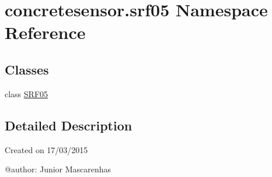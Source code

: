 \hypertarget{namespaceconcretesensor_1_1srf05}{}\section{concretesensor.\+srf05 Namespace Reference}
\label{namespaceconcretesensor_1_1srf05}
\subsection*{Classes}
\begin{DoxyCompactItemize}
\item 
class \hyperlink{classconcretesensor_1_1srf05_1_1SRF05}{S\+R\+F05}
\end{DoxyCompactItemize}


\subsection{Detailed Description}
\begin{DoxyVerb}Created on 17/03/2015

@author: Junior Mascarenhas
\end{DoxyVerb}
 